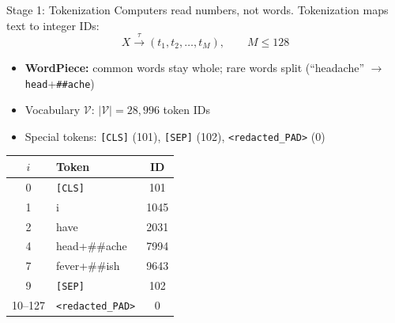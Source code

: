 \begin{frame}{Stage 1: Tokenization}
  \small
  Computers read numbers, not words. Tokenization maps text to integer IDs:
  \[
    X \xrightarrow{\tau} (t_1, t_2, \ldots, t_M), \qquad M \leq 128
  \]

  \begin{itemize}
    \item \textbf{WordPiece:} common words stay whole; rare words split (``headache'' $\to$ \texttt{head}+\texttt{\#\#ache})
    \item Vocabulary $\mathcal{V}$: $|\mathcal{V}| = 28{,}996$ token IDs
    \item Special tokens: \texttt{[CLS]} (101), \texttt{[SEP]} (102), \texttt{<redacted\_PAD>} (0)
  \end{itemize}

  \vspace{0.1cm}
  \footnotesize
  \begin{tabular}{@{}c l c@{}}
    \toprule
    $i$ & Token & ID \\
    \midrule
    0 & \texttt{[CLS]} & 101 \\
    1 & i & 1045 \\
    2 & have & 2031 \\
    4 & head+\#\#ache & 7994 \\
    7 & fever+\#\#ish & 9643 \\
    9 & \texttt{[SEP]} & 102 \\
    10--127 & \texttt{<redacted\_PAD>} & 0 \\
    \bottomrule
  \end{tabular}
\end{frame}

